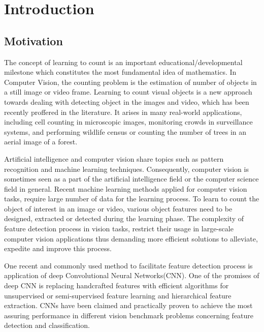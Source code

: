 \chapter{Introduction}
\label{sec:introduction}
\section{Motivation}
The concept of learning to count is an important educational/developmental milestone  which constitutes the most fundamental idea of mathematics. In Computer Vision\cite{umbaugh1997computer}, the counting problem is the estimation of number of objects in a still image or video frame. Learning to count visual objects is a new approach towards dealing with detecting object in the images and video, which has been recently proffered in the literature\cite{viola2005detecting, rabaud2006counting, kong2005counting, chan2008privacy, segui2015learning}. It arises in many real-world applications, including cell counting in microscopic images\cite{flaccavento2011learning}, monitoring crowds in surveillance systems\cite{rahmalan2006crowd, valera2005intelligent}, and performing wildlife census or counting the number of trees in an aerial image of a forest\cite{brandtberg1998automated, pollock1996automatic,NIPS2010_4043}. 

Artificial intelligence and computer vision share topics such as pattern recognition and machine learning\cite{michalski2013machine, mitchell1997machine} techniques. Consequently, computer vision is sometimes seen as a part of the artificial intelligence field or the computer science field in general. Recent machine learning methods applied for computer vision tasks, require large number of data for the learning process. To learn to count the object of interest in an image or video, various object features need to be designed, extracted or detected during the learning phase. The complexity of feature detection process in vision tasks, restrict their usage in large-scale computer vision applications thus demanding more efficient solutions to alleviate, expedite and improve this process. 

\indent One recent and commonly used method to facilitate feature detection process is application of deep Convolutional Neural Networks(CNN)\cite{szegedy2015going, krizhevsky2012imagenet, lecun1995convolutional, sermanet2013overfeat, ji20133d, taylor2010convolutional}. One of the promises of deep CNN is replacing handcrafted features with efficient algorithms for unsupervised or semi-supervised feature learning and hierarchical feature extraction\cite{song2013hierarchical}. CNNs have been claimed and practically proven to achieve the most assuring performance in different vision benchmark problems concerning feature detection and classification\cite{ciresan2011flexible, szegedy2015going, ciresan2012multi}. 

